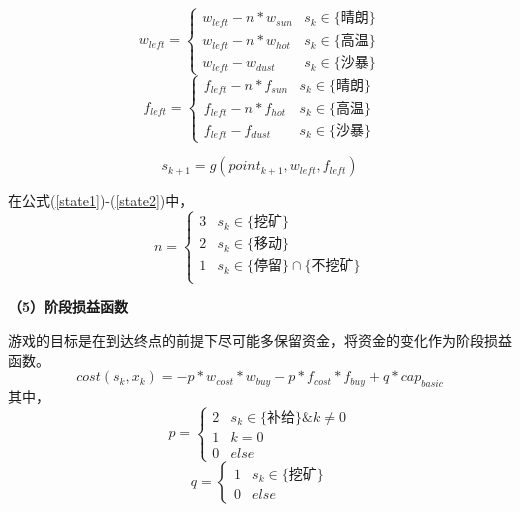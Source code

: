 \documentclass[bwprint]{cumcmthesis} %
\begin{document}
\begin{equation}
    w_{left}=
    \begin{cases}
        w_{left}-n*w_{sun}& s_k \in \text{\{晴朗\}}\\
        w_{left}-n*w_{hot}& s_k \in \text{\{高温\}}
        \\
        w_{left}-w_{dust}& s_k \in \text{\{沙暴\}}
    \end{cases}
    \label{state1}
\end{equation}
\begin{equation}
    f_{left}=
    \begin{cases}
        f_{left}-n*f_{sun}& s_k \in \text{\{晴朗\}}\\
        f_{left}-n*f_{hot}& s_k \in \text{\{高温\}}
        \\
        f_{left}-f_{dust}& s_k \in \text{\{沙暴\}}
    \end{cases}
\end{equation}

\begin{equation}
    s_{k+1}=g(point_{k+1},w_{left},f_{left})
    \label{state2}
\end{equation}

在公式(\ref{state1})-(\ref{state2})中，
\begin{equation}
    n=
    \begin{cases}
        3 & s_k \in \text{\{挖矿\}}\\
        2 & s_k \in \text{\{移动\}}\\
        1 & s_k \in \text{\{停留\}} \cap \text{\{不挖矿\}}\\
    \end{cases}
\end{equation}

\textbf{（5）阶段损益函数} 

游戏的目标是在到达终点的前提下尽可能多保留资金，将资金的变化作为阶段损益函数。
\begin{equation}
    cost(s_k,x_k)=-p*w_{cost}*w_{buy}-p*f_{cost}*f_{buy}+q*cap_{basic}
\end{equation}
其中，
\begin{equation}
    p=
    \begin{cases}
        2 & s_k \in \text{\{补给\}} \& k \neq 0\\
        1 & k=0 \\
        0 & else
    \end{cases}
\end{equation}
\begin{equation}
    q=
    \begin{cases}
        1 & s_k \in \text{\{挖矿\}}\\
        0 & else
    \end{cases}
\end{equation}
\end{document}
